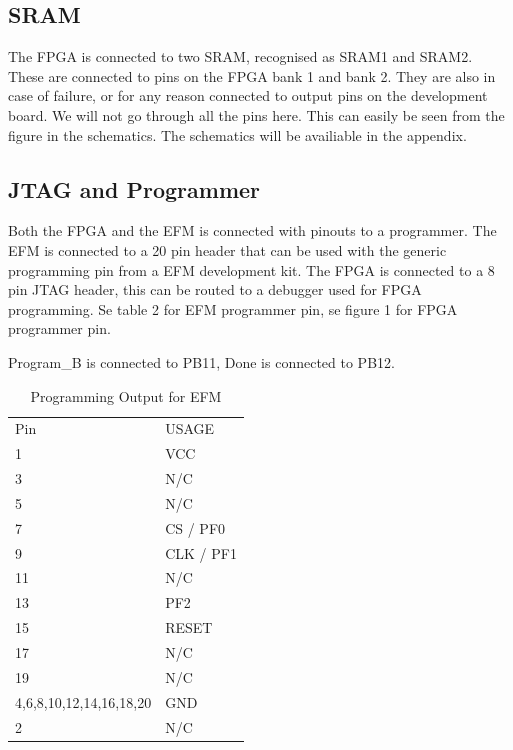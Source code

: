 \subsection{SRAM}
The FPGA is connected to two SRAM, recognised as SRAM1 and SRAM2. These are connected to pins on the FPGA bank 1 and bank 2.  They are also in case of failure, or for any reason connected to output pins on the development board. We will not go through all the pins here. This can easily be seen from the figure in the schematics. The schematics will be availiable in the appendix. 

\subsection{JTAG and Programmer}
Both the FPGA and the EFM is connected with pinouts to a programmer. The EFM is connected to a 20 pin header that can be used with the generic programming pin from a EFM development kit. 
The FPGA is connected to a 8 pin JTAG header, this can be routed to a debugger used for FPGA programming.  Se table 2 for EFM programmer pin, se figure 1 for FPGA programmer pin.

Program\_B is connected to PB11, Done is connected to PB12.
\begin{table}[]
\centering
\caption{Programming Output for EFM}
\label{efmprogrammer}
\begin{tabular}{ll}
Pin                     & USAGE     \\
1                       & VCC       \\
3                       & N/C       \\
5                       & N/C       \\
7                       & CS / PF0  \\
9                       & CLK / PF1 \\
11                      & N/C       \\
13                      & PF2       \\
15                      & RESET     \\
17                      & N/C       \\
19                      & N/C       \\
4,6,8,10,12,14,16,18,20 & GND       \\
2                       & N/C      
\end{tabular}
\end{table}

